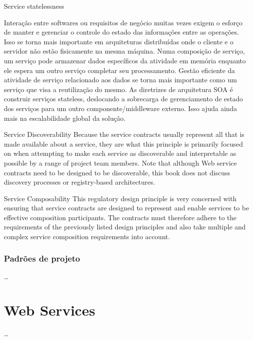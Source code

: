 Service statelessness

Interação entre softwares ou requisitos de negócio muitas vezes exigem o esforço
de manter e gerenciar o controle do estado das informações entre as operações. Isso se torna mais importante em arquiteturas distribuídas onde o cliente e o servidor não estão fisicamente na mesma máquina. Numa composição de serviço, um serviço pode armazenar dados específicos da atividade em memória enquanto ele espera um outro serviço completar seu processamento. Gestão eficiente da atividade de serviço relacionado aos dados se torna mais importante como um serviço que visa a reutilização do mesmo. As diretrizes de arquitetura SOA é construir serviços stateless, deslocando a sobrecarga de gerenciamento de estado dos serviços para um outro componente/middleware externo. Isso ajuda ainda mais na escalabilidade global da solução. 


Service Discoverability
Because the service contracts usually represent all that is made available about a service,
they are what this principle is primarily focused on when attempting to make each service
as discoverable and interpretable as possible by a range of project team members.
Note that although Web service contracts need to be designed to be discoverable, this
book does not discuss discovery processes or registry-based architectures.

Service Composability
This regulatory design principle is very concerned with ensuring that service contracts
are designed to represent and enable services to be effective composition participants.
The contracts must therefore adhere to the requirements of the previously listed design
principles and also take multiple and complex service composition requirements into
account.



\subsubsection{Padrões de projeto }
\vspace{-6mm}

\ldots

\vspace{-6mm}

\section{Web Services}
\vspace{-6mm}

\ldots


